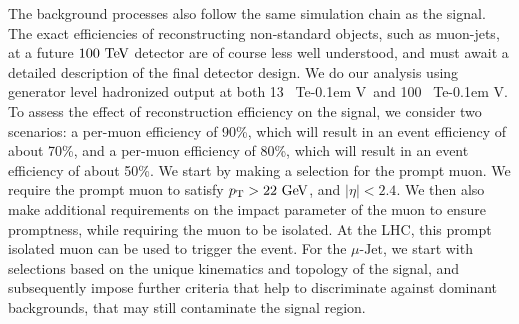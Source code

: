 \documentclass[reprint,doublecolumn,secnumarabic,amssymb, amsmath, aps,nofootinbib,superscriptaddress]{revtex4-1}
\def\TeV{\ifmmode {\mathrm{\ Te\kern -0.1em V}}\else
                   \textrm{Te\kern -0.1em V}\fi}%
\def\GeV{\ifmmode {\mathrm{\ Ge\kern -0.1em V}}\else
                   \textrm{Ge\kern -0.1em V}\fi}%
\newcommand{\pt}      {\ensuremath{p_{\mathrm{T}}}}
\def\abseta{\ensuremath{|\eta|}}
\begin{document}
The background processes also follow the same simulation chain as the signal. The exact efficiencies of reconstructing non-standard objects, such as muon-jets, at a future $100\TeV$ detector are
of course less well understood, and must await a detailed description of the final detector design. We do our analysis using generator level hadronized output at both 13~\TeV\ and 100~\TeV.
To assess the effect of reconstruction efficiency on the signal, we consider two scenarios: a per-muon efficiency of 90\%, which will result in an event efficiency of about 70\%, and a per-muon
efficiency of 80\%, which will result in an event efficiency of about 50\%.
We start by making a selection for the prompt muon. We require the prompt muon to satisfy $\pt > 22\GeV$, and $\abseta < 2.4$. We then also make additional requirements on the impact parameter of the muon to ensure promptness, while requiring the muon to be isolated. At the LHC, this prompt isolated muon can be used to trigger the event. For the $\mu\text{-Jet}$, we start with selections based on the unique kinematics and topology of the signal, and subsequently impose further criteria that help to discriminate against dominant backgrounds, that may still contaminate the signal region. 
\end{document}
